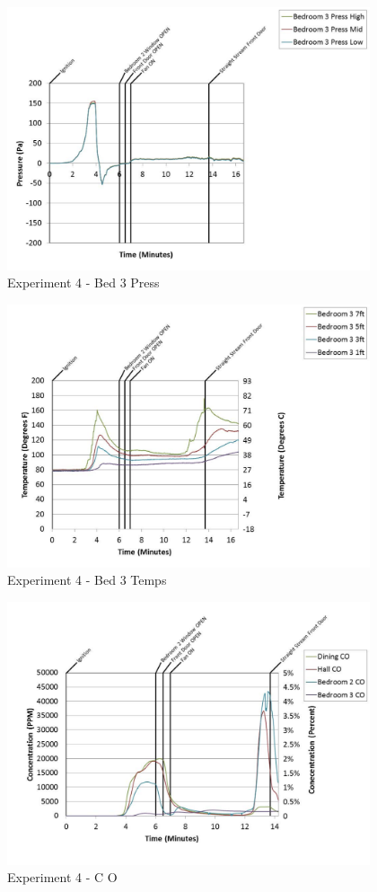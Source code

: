 \documentclass{article}
\begin{document}
\begin{appendices}
	\begin{figure}[h!]
		\centering
		\includegraphics[height=3.05in]{0_Images/Results_Charts/Exp_4_Charts/Bed3Press.pdf}
		\caption{Experiment 4 - Bed 3 Press}
	\end{figure}
 
	\clearpage

	\begin{figure}[h!]
		\centering
		\includegraphics[height=3.05in]{0_Images/Results_Charts/Exp_4_Charts/Bed3Temps.pdf}
		\caption{Experiment 4 - Bed 3 Temps}
	\end{figure}
 

	\begin{figure}[h!]
		\centering
		\includegraphics[height=3.05in]{0_Images/Results_Charts/Exp_4_Charts/CO.pdf}
		\caption{Experiment 4 - C O}
	\end{figure}
 

\end{appendices}
\end{document}
